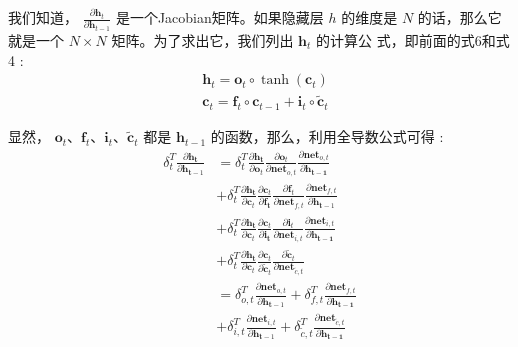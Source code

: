 \documentclass[10.5pt,compsoc]{CjC}
\theoremstyle{mystyle}
\begin{document}
我们知道， $\frac{\partial \mathbf{h}_{t}}{\partial \mathbf{h}_{t-1}}$ 是一个Jacobian矩阵。如果隐藏层 $h$ 的维度是 $N$ 的话，那么它就是一个 $N \times N$ 矩阵。为了求出它，我们列出 $\mathbf{h}_{t}$ 的计算公 式，即前面的式6和式4 :
$$
\begin{aligned}
&\mathbf{h}_{t}=\mathbf{o}_{t} \circ \tanh \left(\mathbf{c}_{t}\right) \\
&\mathbf{c}_{t}=\mathbf{f}_{t} \circ \mathbf{c}_{t-1}+\mathbf{i}_{t} \circ \tilde{\mathbf{c}}_{t}
\end{aligned}
$$

显然， $\mathbf{o}_{t} 、 \mathbf{f}_{t} 、 \mathbf{i}_{t} 、 \tilde{\mathbf{c}}_{t}$ 都是 $\mathbf{h}_{t-1}$ 的函数，那么，利用全导数公式可得 :
$$
\begin{aligned}
\delta_{t}^{T} \frac{\partial \mathbf{h}_{\mathbf{t}}}{\partial \mathbf{h}_{\mathbf{t}-1}} &=\delta_{t}^{T} \frac{\partial \mathbf{h}_{\mathbf{t}}}{\partial \mathbf{o}_{t}} \frac{\partial \mathbf{o}_{t}}{\partial \mathbf{n e t}_{o, t}} \frac{\partial \mathbf{n e t}_{o, t}}{\partial \mathbf{h}_{\mathbf{t}-\mathbf{1}}}\\
&+\delta_{t}^{T} \frac{\partial \mathbf{h}_{\mathbf{t}}}{\partial \mathbf{c}_{t}} \frac{\partial \mathbf{c}_{t}}{\partial \mathbf{f}_{\mathbf{t}}} \frac{\partial \mathbf{f}_{t}}{\partial \mathbf{n e t}_{f, t}} \frac{\partial \mathbf{n e t}_{f, t}}{\partial \mathbf{h}_{\mathbf{t}-1}}\\
&+\delta_{t}^{T} \frac{\partial \mathbf{h}_{\mathbf{t}}}{\partial \mathbf{c}_{t}} \frac{\partial \mathbf{c}_{t}}{\partial \mathbf{i}_{\mathbf{t}}} \frac{\partial \mathbf{i}_{t}}{\partial \mathbf{n e t}_{i, t}} \frac{\partial \mathbf{n e t}_{i, t}}{\partial \mathbf{h}_{\mathbf{t}-\mathbf{1}}}\\
&+\delta_{t}^{T} \frac{\partial \mathbf{h}_{\mathbf{t}}}{\partial \mathbf{c}_{t}} \frac{\partial \mathbf{c}_{t}}{\partial \tilde{\mathbf{c}}_{t}} \frac{\partial \tilde{\mathbf{c}}_{t}}{\partial \mathbf{n e t}_{\tilde{c}, t}} \\
&=\delta_{o, t}^{T} \frac{\partial \mathbf{n e t}_{o, t}}{\partial \mathbf{h}_{\mathbf{t}-1}}+\delta_{f, t}^{T} \frac{\partial \mathbf{n e t}_{f, t}}{\partial \mathbf{h}_{\mathbf{t}-\mathbf{1}}}\\
&+\delta_{i, t}^{T} \frac{\partial \mathbf{n e t}_{i, t}}{\partial \mathbf{h}_{\mathbf{t}-1}}+\delta_{\tilde{c}, t}^{T} \frac{\partial \mathbf{n e t}_{\tilde{c}, t}}{\partial \mathbf{h}_{\mathbf{t}-\mathbf{1}}}
\end{aligned}
$$
\end{document}

